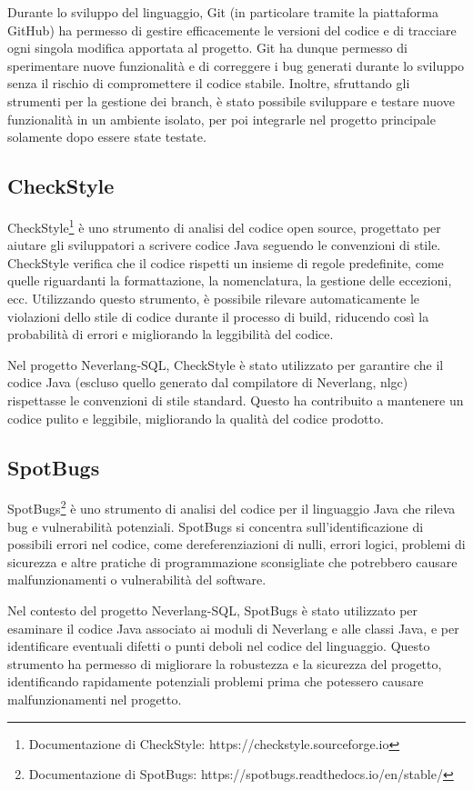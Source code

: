 \documentclass[12pt,a4paper,openright,twoside]{book}
\begin{document}
Durante lo sviluppo del linguaggio, Git (in particolare tramite la piattaforma GitHub) ha permesso di gestire efficacemente le versioni del 
codice e di tracciare ogni singola modifica apportata al progetto. Git ha dunque permesso di sperimentare nuove funzionalità e di correggere 
i bug generati durante lo sviluppo senza il rischio di compromettere il codice stabile. Inoltre, sfruttando gli strumenti per la gestione dei 
branch, è stato possibile sviluppare e testare nuove funzionalità in un ambiente isolato, per poi integrarle nel progetto principale solamente 
dopo essere state testate.

\subsection{CheckStyle}
CheckStyle\footnote{Documentazione di CheckStyle: https://checkstyle.sourceforge.io} è uno strumento di analisi del codice open source, 
progettato per aiutare gli sviluppatori a scrivere codice Java seguendo le convenzioni di stile. CheckStyle verifica che il codice rispetti 
un insieme di regole predefinite, come quelle riguardanti la formattazione, la nomenclatura, la gestione delle eccezioni, ecc. Utilizzando 
questo strumento, è possibile rilevare automaticamente le violazioni dello stile di codice durante il processo di build, riducendo così la 
probabilità di errori e migliorando la leggibilità del codice.

Nel progetto Neverlang-SQL, CheckStyle è stato utilizzato per garantire che il codice Java (escluso quello generato dal compilatore di 
Neverlang, nlgc) rispettasse le convenzioni di stile standard. Questo ha contribuito a mantenere un codice pulito e leggibile, migliorando 
la qualità del codice prodotto.

\subsection{SpotBugs}
SpotBugs\footnote{Documentazione di SpotBugs: https://spotbugs.readthedocs.io/en/stable/} è uno strumento di analisi del codice per il 
linguaggio Java che rileva bug e vulnerabilità potenziali. SpotBugs si concentra sull’identificazione di possibili errori nel codice, come 
dereferenziazioni di nulli, errori logici, problemi di sicurezza e altre pratiche di programmazione sconsigliate che potrebbero causare 
malfunzionamenti o vulnerabilità del software.

Nel contesto del progetto Neverlang-SQL, SpotBugs è stato utilizzato per esaminare il codice Java associato ai moduli di Neverlang e alle 
classi Java, e per identificare eventuali difetti o punti deboli nel codice del linguaggio. Questo strumento ha permesso di migliorare la 
robustezza e la sicurezza del progetto, identificando rapidamente potenziali problemi prima che potessero causare malfunzionamenti nel 
progetto.
\end{document}
